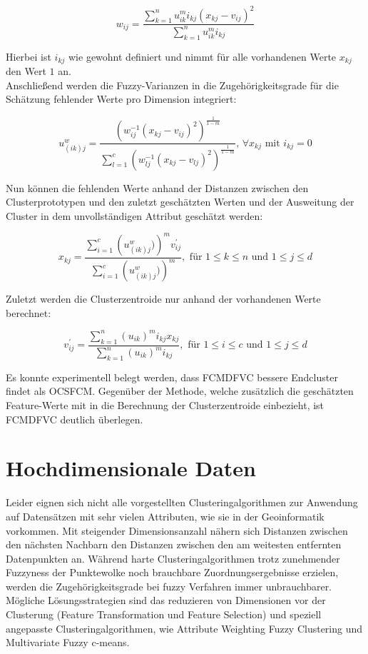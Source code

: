 \documentclass[11pt,ceqn]{book}
\begin{document}
$$w_{ij} = \frac{\sum\limits_{k=1}^n u_{ik}^m i_{kj} (x_{kj}-v_{ij})^2}{\sum\limits_{k=1}^n u_{ik}^m i_{kj}}$$

Hierbei ist $i_{kj}$ wie gewohnt definiert und nimmt für alle vorhandenen Werte $x_{kj}$ den Wert $1$ an.\\

Anschließend werden die Fuzzy-Varianzen in die Zugehörigkeitsgrade für die Schätzung fehlender Werte pro Dimension integriert:

$$u_{(ik)j}^w = \frac{\left(w_{ij}^{-1}(x_{kj}-v_{ij})^2 \right)^{\frac{1}{1-m}}}{\sum\limits_{l=1}^c \left(w_{lj}^{-1}(x_{kj}-v_{lj})^2\right)^{\frac{1}{1-m}}}, \, \forall x_{kj} \text{ mit } i_{kj}=0$$

Nun können die fehlenden Werte anhand der Distanzen zwischen den Clusterprototypen und den zuletzt geschätzten Werten und der Ausweitung der Cluster in dem unvollständigen Attribut geschätzt werden:

$$x_{kj} = \frac{\sum\limits_{i=1}^c \left(u_{(ik)j}^w) \right)^m v_{ij}^{\prime}}{\sum\limits_{i=1}^c \left(u_{(ik)j}^w) \right)^m}, \text{ für } 1\leqslant k \leqslant n \text{ und } 1\leqslant j\leqslant d$$

Zuletzt werden die Clusterzentroide nur anhand der vorhandenen Werte berechnet:

$$v_{ij}^{\prime} = \frac{\sum\limits_{k=1}^n (u_{ik})^m i_{kj} x_{kj}}{\sum\limits_{k=1}^n (u_{ik})^m i_{kj}},\text{ für }  1\leqslant i \leqslant c \text{ und } 1\leqslant j \leqslant d$$

Es konnte experimentell belegt werden, dass FCMDFVC bessere Endcluster findet als OCSFCM. Gegenüber der Methode, welche zusätzlich die geschätzten Feature-Werte mit in die Berechnung der Clusterzentroide einbezieht, ist FCMDFVC deutlich überlegen.

\section{Hochdimensionale Daten}
Leider eignen sich nicht alle vorgestellten Clusteringalgorithmen zur Anwendung auf Datensätzen mit sehr vielen Attributen, wie sie in der Geoinformatik vorkommen. Mit steigender Dimensionsanzahl nähern sich Distanzen zwischen den nächsten Nachbarn den Distanzen zwischen den am weitesten entfernten Datenpunkten an. Während harte Clusteringalgorithmen trotz zunehmender Fuzzyness der Punktewolke noch brauchbare Zuordnungsergebnisse erzielen, werden die Zugehörigkeitsgrade bei fuzzy Verfahren immer unbrauchbarer.
Mögliche Lösungsstrategien sind das reduzieren von Dimensionen vor der Clusterung (Feature Transformation und Feature Selection) und speziell angepasste Clusteringalgorithmen, wie Attribute Weighting Fuzzy Clustering und Multivariate Fuzzy c-means.
\\~\\
\end{document}
